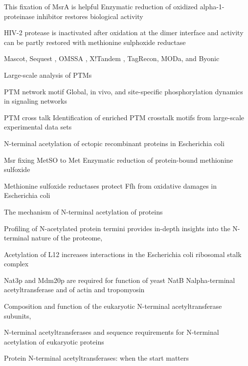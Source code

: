 \documentclass[12pt]{article}
\begin{document}
This fixation of MsrA is helpful \cite{Abramsetal1981}
{Enzymatic reduction of oxidized alpha-1-proteinase inhibitor restores biological activity}

\cite{Davisetal2000}
{HIV-2 protease is inactivated after oxidation at the dimer interface and activity can be partly restored with methionine sulphoxide reductase}

Mascot\cite{Perkinsetal1999}, Sequest \cite{Engetal1994}, OMSSA \cite{Geeretal2004}, X!Tandem \cite{CraigBeavis2004}, TagRecon\cite{Dasarietal2010}, MODa\cite{Naetal2012}, and Byonic \cite{Bernetal2012}

Large-scale analysis of PTMs \cite{OlsenMann2013}

PTM network motif \cite{Olsenetal2006}
{Global, in vivo, and site-specific phosphorylation dynamics in signaling networks}

PTM cross talk \cite{Pengetal2014}
{Identification of enriched PTM crosstalk motifs from large-scale experimental data sets}

\cite{Charbautetal2002}
{N-terminal acetylation of ectopic recombinant proteins in Escherichia coli}

Msr fixing MetSO to Met \cite{Brotetal1981}
{Enzymatic reduction of protein-bound methionine sulfoxide}

\cite{Ezratyetal2004}
{Methionine sulfoxide reductases protect Ffh from oxidative damages in Escherichia coli}

\cite{Driessenetal1985}
{The mechanism of N-terminal acetylation of proteins}

\cite{Helbigetal2010}
{Profiling of N-acetylated protein termini provides in-depth insights into the N-terminal nature of the proteome},

\cite{Gordiyenkoetal2008}
 {Acetylation of L12 increases interactions in the Escherichia coli ribosomal stalk complex}
 
\cite{Polevodaetal2003}
{Nat3p and Mdm20p are required for function of yeast NatB Nalpha-terminal acetyltransferase and of actin and tropomyosin}
   
\cite{PolevodaSherman2003}
{Composition and function of the eukaryotic N-terminal acetyltransferase subunits},
   
\cite{PolevodaSherman2003b}
{N-terminal acetyltransferases and sequence requirements for N-terminal acetylation of eukaryotic proteins}

\cite{Starheimetal2012}
{Protein N-terminal acetyltransferases: when the start matters}
\end{document}
